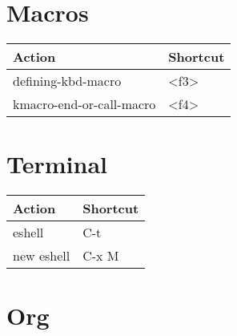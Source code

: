 \documentclass[english]{rcalibrionecolumn}
\begin{document}
\section{Macros}
\label{sec-11}


\begin{center}
\begin{tabular}{ll}
 \textbf{Action}           &  \textbf{Shortcut}  \\
\hline
 defining-kbd-macro        &  <f3>               \\
 kmacro-end-or-call-macro  &  <f4>               \\
\end{tabular}
\end{center}
\section{Terminal}
\label{sec-12}


\begin{center}
\begin{tabular}{ll}
 \textbf{Action}  &  \textbf{Shortcut}  \\
\hline
 eshell           &  C-t                \\
 new eshell       &  C-x M              \\
\end{tabular}
\end{center}
\section{Org}
\label{sec-13}
\end{document}
